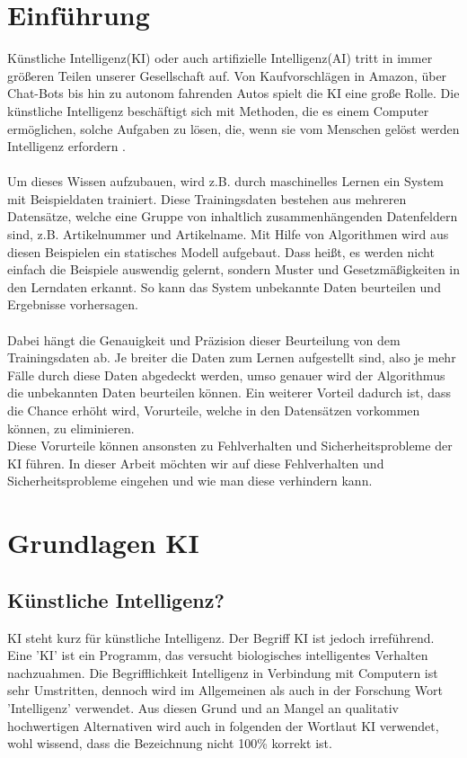 \documentclass[12pt,oneside,a4paper,parskip]{scrbook}
\begin{document}
\chapter{Einführung}
\label{chapter:intro}
Künstliche Intelligenz(KI) oder auch artifizielle Intelligenz(AI) tritt in immer größeren Teilen unserer Gesellschaft auf. Von Kaufvorschlägen in Amazon, über Chat-Bots bis hin zu autonom fahrenden Autos spielt die KI eine große Rolle. Die künstliche Intelligenz beschäftigt sich mit Methoden, die es einem Computer ermöglichen, solche Aufgaben zu lösen, die, wenn sie vom Menschen gelöst werden Intelligenz erfordern \cite{kiDefinition}.
\\\\
Um dieses Wissen aufzubauen, wird z.B. durch maschinelles Lernen ein System mit Beispieldaten trainiert. 
Diese Trainingsdaten bestehen aus mehreren Datensätze, welche eine Gruppe von inhaltlich zusammenhängenden Datenfeldern sind, z.B. Artikelnummer und Artikelname.
Mit Hilfe von Algorithmen wird aus diesen Beispielen ein statisches Modell aufgebaut. Dass heißt, es werden nicht einfach die Beispiele auswendig gelernt, sondern Muster und Gesetzmäßigkeiten in den Lerndaten erkannt. So kann das System unbekannte Daten beurteilen und Ergebnisse vorhersagen.
\\\\
Dabei hängt die Genauigkeit und Präzision dieser Beurteilung von dem Trainingsdaten ab. Je breiter die Daten zum Lernen aufgestellt sind, also je mehr Fälle durch diese Daten abgedeckt werden, umso genauer wird der Algorithmus die unbekannten Daten beurteilen können. Ein weiterer Vorteil dadurch ist, dass die Chance erhöht wird, Vorurteile, welche in den Datensätzen vorkommen können, zu eliminieren.\\
Diese Vorurteile können ansonsten zu Fehlverhalten und Sicherheitsprobleme der KI führen. In dieser Arbeit möchten wir auf diese Fehlverhalten und Sicherheitsprobleme eingehen und wie man diese verhindern kann.


\chapter{Grundlagen KI}

\section{Künstliche Intelligenz?}
KI steht kurz für künstliche Intelligenz. Der Begriff KI ist jedoch irreführend. Eine 'KI' ist ein Programm, das versucht biologisches intelligentes Verhalten nachzuahmen. Die Begrifflichkeit Intelligenz in Verbindung mit Computern ist sehr Umstritten, 
dennoch wird im Allgemeinen als auch in der Forschung Wort 'Intelligenz' verwendet. 
Aus diesen Grund und an Mangel an qualitativ hochwertigen Alternativen wird auch in folgenden der Wortlaut KI verwendet, wohl wissend, dass die Bezeichnung nicht 100\% korrekt ist.
\end{document}
